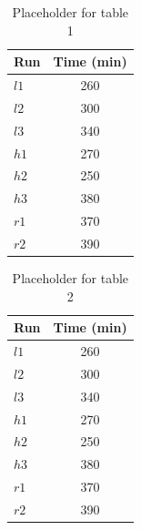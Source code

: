 \documentclass[jgrga, draft]{agutex}
\begin{document}
%
%
\clearpage

\begin{table}
\caption{Placeholder for table 1}
\centering
\begin{tabular}{l c}
\hline
Run  & Time (min)  \\
\hline
 $l1$  & 260   \\
 $l2$  & 300   \\
 $l3$  & 340   \\
 $h1$  & 270   \\
 $h2$  & 250   \\
 $h3$  & 380   \\
 $r1$  & 370   \\
 $r2$  & 390   \\
\hline
\end{tabular}
\label{table:1}
\end{table}

\clearpage

\begin{table}
\caption{Placeholder for table 2}
\centering
\begin{tabular}{l c}
\hline
Run  & Time (min)  \\
\hline
 $l1$  & 260   \\
 $l2$  & 300   \\
 $l3$  & 340   \\
 $h1$  & 270   \\
 $h2$  & 250   \\
 $h3$  & 380   \\
 $r1$  & 370   \\
 $r2$  & 390   \\
\hline
\end{tabular}
\label{table:2}
\end{table}

\end{document}

